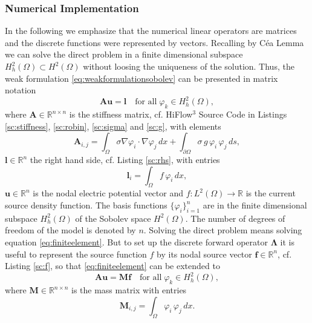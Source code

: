 \documentclass[a4paper, 11pt, twoside]{article}
\begin{document}
\subsubsection{Numerical Implementation}
%
In the following we emphasize that the numerical linear operators are matrices and the discrete functions were represented by vectors. Recalling by C\'{e}a Lemma \cite{bib:bra03} we can solve the direct problem in a finite dimensional subspace $H^2_h(\Omega)\subset H^2(\Omega)$ without loosing the uniqueness of the solution. Thus, the weak formulation \eqref{eq:weakformulationsobolev} can be presented in matrix notation
%
\begin{equation}\label{eq:finiteelement}
	\boldsymbol{A}\boldsymbol{u}=\boldsymbol{l}\quad\text{for all}\;\varphi_k\in H^2_h(\Omega),
\end{equation}
%
where $\boldsymbol{A}\in\mathbb{R}^{n\times n}$ is the stiffness matrix, cf. HiFlow$^3$ Source Code in Listings \ref{sc:stiffness}, \ref{sc:robin}, \ref{sc:sigma} and \ref{sc:g}, with elements
%
\begin{equation*}
	\boldsymbol{A}_{i,j}=\int_{\Omega}\sigma\nabla\varphi_i\cdot\nabla\varphi_j\,dx
	+\int_{\partial\Omega}\sigma\,g\,\varphi_i\,\varphi_j\,ds,
\end{equation*}
%
$\boldsymbol{l}\in\mathbb{R}^n$ the right hand side, cf. Listing \ref{sc:rhs}, with entries
%
\begin{equation*}
	\boldsymbol{l}_{i}=\int_{\Omega}f\,\varphi_i\,dx,
\end{equation*}
%
$\boldsymbol{u}\in\mathbb{R}^n$ is the nodal electric potential vector and $f:L^2(\Omega)\to\mathbb{R}$ is the current source density function. The basis functions $\{\varphi_i\}^n_{i=1}$ are in the finite dimensional subspace $H^2_h(\Omega)$ of the Sobolev space $H^2(\Omega)$. The number of degrees of freedom of the model is denoted by $n$. Solving the direct problem means solving equation \eqref{eq:finiteelement}. But to set up the discrete forward operator $\boldsymbol{\Lambda}$ it is useful to represent the source function $f$ by its nodal source vector $\boldsymbol{f}\in\mathbb{R}^n$, cf. Listing \ref{sc:f}, so that \eqref{eq:finiteelement} can be extended to
%
\begin{equation}\label{eq:finiteelement2}
	\boldsymbol{A}\boldsymbol{u}=\boldsymbol{M}\boldsymbol{f}\quad\text{for all}\;\varphi_k\in H^2_h(\Omega),
\end{equation}
%
where $\boldsymbol{M}\in\mathbb{R}^{n\times n}$ is the mass matrix with entries
%
\begin{equation}\label{eq:massmatrix}
	\boldsymbol{M}_{i,j}=\int_{\Omega}\varphi_i\,\varphi_j\,dx.
\end{equation}
\end{document}
